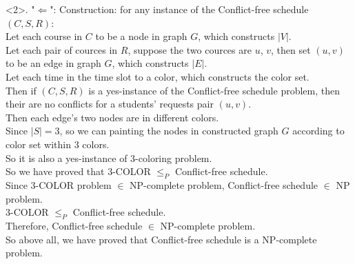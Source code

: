<2>. "$\Leftarrow$":
Construction: for any instance of the Conflict-free schedule $(C, S, R)$:\\
Let each course in $C$ to be a node in graph $G$, which constructs $|V|$.\\
Let each pair of cources in $R$, suppose the two cources are $u$, $v$, then set $(u, v)$ to be an edge in graph $G$, which constructs $|E|$.\\
Let each time in the time slot to a color, which constructs the color set.\\
Then if $(C, S, R)$ is a yes-instance of the Conflict-free schedule problem, then their are no conflicts for a students' requests pair $(u,v)$.\\
Then each edge's two nodes are in different colors.\\
Since $|S|=3$, so we can painting the nodes in constructed graph $G$ according to color set within $3$ colors.\\
So it is also a yes-instance of $3$-coloring problem.\\

So we have proved that $3$-COLOR $\leq_P$ Conflict-free schedule.\\

Since $3$-COLOR problem $\in$ NP-complete problem, Conflict-free schedule $\in$ NP problem.\\
$3$-COLOR $\leq_P$ Conflict-free schedule.\\
Therefore, Conflict-free schedule $\in$ NP-complete problem.\\

So above all, we have proved that Conflict-free schedule is a NP-complete problem.

\newpage